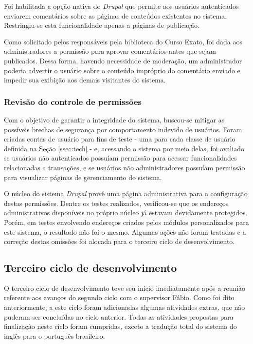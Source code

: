 \documentclass[a4paper]{article}
\begin{document}
Foi habilitada a opção nativa do \textit{Drupal} que permite aos usuários autenticados enviarem comentários sobre as páginas de conteúdos existentes no sistema. Restringiu-se esta funcionalidade apenas a páginas de publicação.

Como solicitado pelos responsáveis pela biblioteca do Curso Exato, foi dada aos administradores a permissão para aprovar comentários antes que sejam publicados. Dessa forma, havendo necessidade de moderação, um administrador poderia advertir o usuário sobre o conteúdo impróprio do comentário enviado e impedir sua exibição aos demais visitantes do sistema.

\subsubsection{Revisão do controle de permissões}

Com o objetivo de garantir a integridade do sistema, buscou-se mitigar as possíveis brechas de segurança por comportamento indevido de usuários. Foram criadas contas de usuário para fins de teste - uma para cada classe de usuário definida na Seção \ref{ssec:tech} - e, acessando o sistema por meio delas, foi avaliado se usuários não autenticados possuíam permissão para acessar funcionalidades relacionadas a transações, e se usuários não administradores possuíam permissão para visualizar páginas de gerenciamento do sistema.

O núcleo do sistema \textit{Drupal} provê uma página administrativa para a configuração destas permissões. Dentre os testes realizados, verificou-se que os endereços administrativos disponíveis no próprio núcleo já estavam devidamente protegidos. Porém, em testes envolvendo endereços criados pelos módulos personalizados para este sistema, o resultado não foi o mesmo. Algumas ações não foram tratadas e a correção destas omissões foi alocada para o terceiro ciclo de desenvolvimento.

\subsection{Terceiro ciclo de desenvolvimento}

O terceiro ciclo de desenvolvimento teve seu início imediatamente após a reunião referente aos avanços do segundo ciclo com o supervisor Fábio. Como foi dito anteriormente, a este ciclo foram adicionadas algumas atividades extras, que não puderam ser concluídas no ciclo anterior. Todas as atividades propostas para finalização neste ciclo foram cumpridas, exceto a tradução total do sistema do inglês para o português brasileiro.
\end{document}
